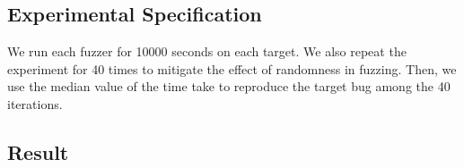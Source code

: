 \documentclass[12pt]{sigplanconf}
\begin{document}
\subsection{Experimental Specification}
We run each fuzzer for 10000 seconds on each target.
We also repeat the experiment for 40 times to mitigate the effect of randomness in fuzzing.
Then, we use the median value of the time take to reproduce the target bug among the 40 iterations.


\subsection{Result}







\end{document}
